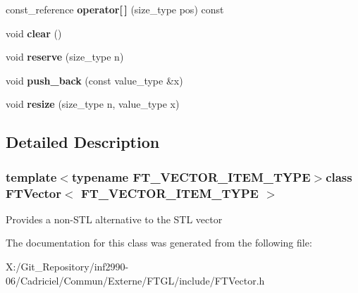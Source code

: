 \begin{DoxyCompactItemize}
\item 
\hypertarget{class_f_t_vector_a3da21c8d8b89ab5f0ad2d4db5fef89c5}{const\-\_\-reference {\bfseries operator\mbox{[}$\,$\mbox{]}} (size\-\_\-type pos) const }\label{class_f_t_vector_a3da21c8d8b89ab5f0ad2d4db5fef89c5}

\item 
\hypertarget{class_f_t_vector_a67f25dc63f17ffa9d7cc12c11175e900}{void {\bfseries clear} ()}\label{class_f_t_vector_a67f25dc63f17ffa9d7cc12c11175e900}

\item 
\hypertarget{class_f_t_vector_a148e3c1116a60d9c3edd787936e0df27}{void {\bfseries reserve} (size\-\_\-type n)}\label{class_f_t_vector_a148e3c1116a60d9c3edd787936e0df27}

\item 
\hypertarget{class_f_t_vector_a791d950e681867166b7afaca20c72722}{void {\bfseries push\-\_\-back} (const value\-\_\-type \&x)}\label{class_f_t_vector_a791d950e681867166b7afaca20c72722}

\item 
\hypertarget{class_f_t_vector_a44869ccb17027d3880c5b5054c325dba}{void {\bfseries resize} (size\-\_\-type n, value\-\_\-type x)}\label{class_f_t_vector_a44869ccb17027d3880c5b5054c325dba}

\end{DoxyCompactItemize}


\subsection{Detailed Description}
\subsubsection*{template$<$typename F\-T\-\_\-\-V\-E\-C\-T\-O\-R\-\_\-\-I\-T\-E\-M\-\_\-\-T\-Y\-P\-E$>$class F\-T\-Vector$<$ F\-T\-\_\-\-V\-E\-C\-T\-O\-R\-\_\-\-I\-T\-E\-M\-\_\-\-T\-Y\-P\-E $>$}

Provides a non-\/\-S\-T\-L alternative to the S\-T\-L vector 

The documentation for this class was generated from the following file\-:\begin{DoxyCompactItemize}
\item 
X\-:/\-Git\-\_\-\-Repository/inf2990-\/06/\-Cadriciel/\-Commun/\-Externe/\-F\-T\-G\-L/include/F\-T\-Vector.\-h\end{DoxyCompactItemize}

